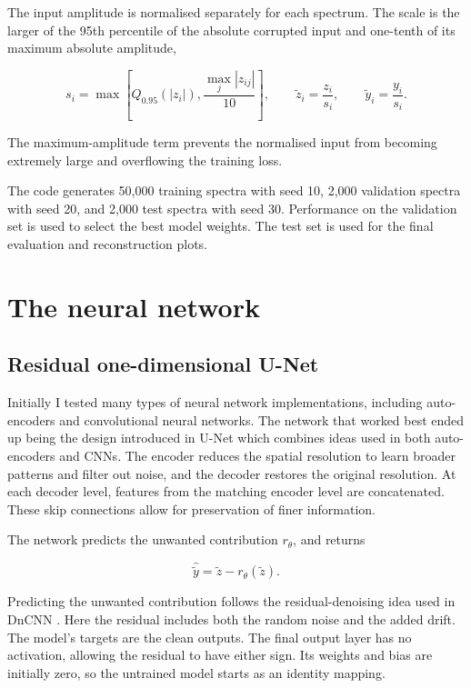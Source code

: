 The input amplitude is normalised separately for each spectrum. The scale is the larger of the 95th percentile of the absolute corrupted input and one-tenth of its maximum absolute amplitude,

\begin{equation}
 s_i=\max\left[Q_{0.95}\!\left(|z_i|\right),\frac{\max_j|z_{ij}|}{10}\right],\qquad
 \widetilde z_i=\frac{z_i}{s_i},\qquad \widetilde y_i=\frac{y_i}{s_i}.
 \label{eq:normalisation}
\end{equation}

The maximum-amplitude term prevents the normalised input from becoming extremely large and overflowing the training loss.

The code generates 50,000 training spectra with seed 10, 2,000 validation spectra with seed 20, and 2,000 test spectra with seed 30. Performance on the validation set is used to select the best model weights. The test set is used for the final evaluation and reconstruction plots.

\section{The neural network}

\subsection{Residual one-dimensional U-Net}

Initially I tested many types of neural network implementations, including auto-encoders and convolutional neural networks. The network that worked best ended up being the design introduced in U-Net \cite{ronneberger2015} which combines ideas used in both auto-encoders and CNNs. The encoder reduces the spatial resolution to learn broader patterns and filter out noise, and the decoder restores the original resolution. At each decoder level, features from the matching encoder level are concatenated. These skip connections allow for preservation of finer information.

The network predicts the unwanted contribution $r_\theta$, and returns

\begin{equation}
 \widehat{\widetilde y}=\widetilde z-r_\theta(\widetilde z).
 \label{eq:residual}
\end{equation}

Predicting the unwanted contribution follows the residual-denoising idea used in DnCNN \cite{zhang2017}. Here the residual includes both the random noise and the added drift. The model's targets are the clean outputs. The final output layer has no activation, allowing the residual to have either sign. Its weights and bias are initially zero, so the untrained model starts as an identity mapping.


